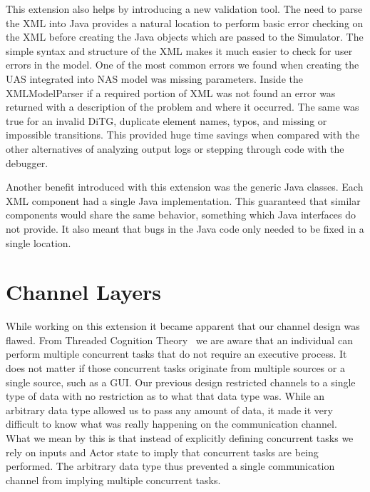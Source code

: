 This extension also helps by introducing a new validation tool.  The need to parse the XML into Java provides a natural location to perform basic error checking on the XML before creating the Java objects which are passed to the Simulator. The simple syntax and structure of the XML makes it much easier to check for user errors in the model.  One of the most common errors we found when creating the UAS integrated into NAS model was missing parameters.  Inside the XMLModelParser if a required portion of XML was not found an error was returned with a description of the problem and where it occurred.  The same was true for an invalid DiTG, duplicate element names, typos, and missing or impossible transitions.  This provided huge time savings when compared with the other alternatives of analyzing output logs or stepping through code with the debugger.

Another benefit introduced with this extension was the generic Java classes.  Each XML component had a single Java implementation.  This guaranteed that similar components would share the same behavior, something which Java interfaces do not provide.  It also meant that bugs in the Java code only needed to be fixed in a single location.

\section{Channel Layers}

While working on this extension it became apparent that our channel design was flawed.  From Threaded Cognition Theory~\cite{salvucci2008threaded} we are aware that an individual can perform multiple concurrent tasks that do not require an executive process.  It does not matter if those concurrent tasks originate from multiple sources or a single source, such as a GUI.  Our previous design restricted channels to a single type of data with no restriction as to what that data type was.  While an arbitrary data type allowed us to pass any amount of data, it made it very difficult to know what was really happening on the communication channel.  What we mean by this is that instead of explicitly defining concurrent tasks we rely on inputs and Actor state to imply that concurrent tasks are being performed.  The arbitrary data type thus prevented a single communication channel from implying multiple concurrent tasks.

